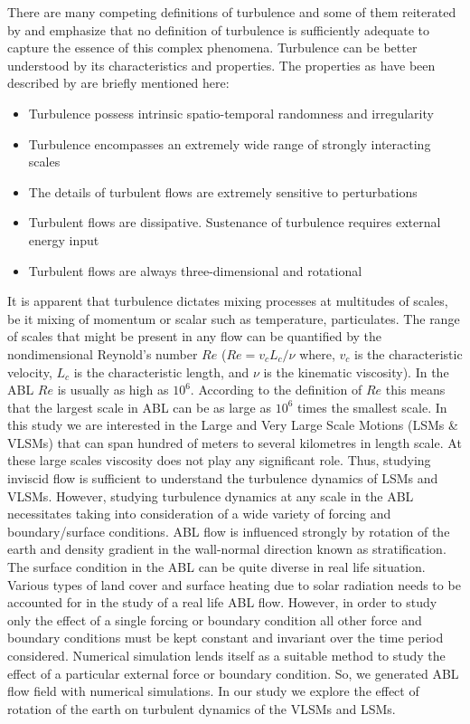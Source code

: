 There are many competing definitions of turbulence and some of them reiterated by \citet{hinze_book_75} and \citet{tsinober_book_2001} emphasize that no definition of turbulence is sufficiently adequate to capture the essence of this complex phenomena. Turbulence can be better understood by its characteristics and properties. The properties as have been described by \citet{tsinober_book_2001} are briefly mentioned here: 
\begin{itemize}
	\item Turbulence possess  intrinsic spatio-temporal randomness and irregularity
	\item Turbulence encompasses an extremely wide range of strongly interacting scales
	\item The details of turbulent flows are extremely sensitive to perturbations 
	\item Turbulent flows are dissipative. Sustenance of turbulence requires external energy input
	\item Turbulent flows are always three-dimensional and rotational
\end{itemize}
It is apparent that turbulence dictates mixing processes at multitudes of scales, be it mixing of momentum or scalar such as temperature, particulates. The range of scales that might be present in any flow can be quantified by the nondimensional Reynold's number $Re$ ($Re = v_c L_c/\nu$ where, $v_c$ is the characteristic velocity, $L_c$ is the characteristic length, and $\nu$ is the kinematic viscosity). In the ABL $Re$ is usually as high as $10^6$. According to the definition of $Re$ this means that the largest scale in ABL can be as large as $10^6$ times the smallest scale. In this study we are interested in the Large and Very Large Scale Motions (LSMs \& VLSMs) that can span hundred of meters to several kilometres in length scale. At these large scales viscosity does not play any significant role. Thus, studying inviscid flow is sufficient to understand the turbulence dynamics of LSMs and VLSMs. However, studying turbulence dynamics at any scale in the ABL necessitates taking into consideration of a wide variety of forcing and boundary/surface conditions. ABL flow is influenced strongly by rotation of the earth and density gradient in the wall-normal direction known as stratification. The surface condition in the ABL can be quite diverse in real life situation. Various types of land cover and surface heating due to solar radiation needs to be accounted for in the study of a real life ABL flow. However, in order to study only the effect of a single forcing or boundary condition all other force and boundary conditions must be kept constant and invariant over the time period considered. Numerical simulation lends itself as a suitable method to study the effect of a particular external force or boundary condition. So, we generated ABL flow field with numerical simulations. In our study we explore the effect of rotation of the earth on turbulent dynamics of the VLSMs and LSMs.    

